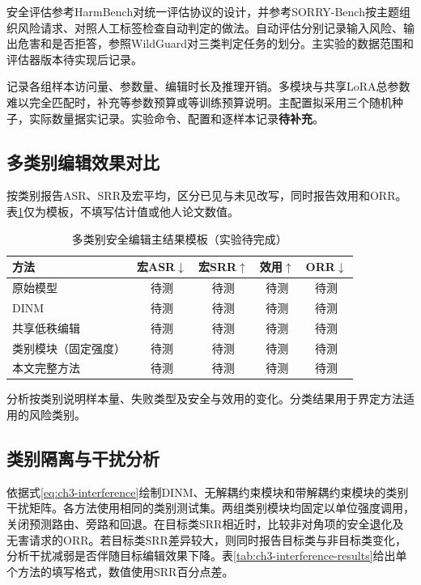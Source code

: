安全评估参考HarmBench对统一评估协议的设计，并参考SORRY-Bench按主题组织风险请求、对照人工标签检查自动判定的做法\cite{mazeika2024harmbench,xie2025sorrybench}。自动评估分别记录输入风险、输出危害和是否拒答，参照WildGuard对三类判定任务的划分\cite{han2024wildguard}。主实验的数据范围和评估器版本待实现后记录。

记录各组样本访问量、参数量、编辑时长及推理开销。多模块与共享LoRA总参数难以完全匹配时，补充等参数预算或等训练预算说明。主配置拟采用三个随机种子，实际数量据实记录。实验命令、配置和逐样本记录\textbf{待补充}。

\subsection{多类别编辑效果对比}

按类别报告ASR、SRR及宏平均，区分已见与未见改写，同时报告效用和ORR。表\ref{tab:ch3-main-results}仅为模板，不填写估计值或他人论文数值。
\begin{table}[htbp]
 \centering
 \caption{多类别安全编辑主结果模板（实验待完成）}
 \label{tab:ch3-main-results}
 \begin{tabular}{p{}cccc}
 \toprule
 方法 & 宏ASR$\downarrow$ & 宏SRR$\uparrow$ & 效用$\uparrow$ & ORR$\downarrow$\\ \midrule
 原始模型 & 待测 & 待测 & 待测 & 待测\\
 DINM & 待测 & 待测 & 待测 & 待测\\
 共享低秩编辑 & 待测 & 待测 & 待测 & 待测\\
 类别模块（固定强度） & 待测 & 待测 & 待测 & 待测\\
 本文完整方法 & 待测 & 待测 & 待测 & 待测\\
 \bottomrule
 \end{tabular}
\end{table}

分析按类别说明样本量、失败类型及安全与效用的变化。分类结果用于界定方法适用的风险类别。

\subsection{类别隔离与干扰分析}

依据式\eqref{eq:ch3-interference}绘制DINM、无解耦约束模块和带解耦约束模块的类别干扰矩阵。各方法使用相同的类别测试集。两组类别模块均固定以单位强度调用，关闭预测路由、旁路和回退。在目标类SRR相近时，比较非对角项的安全退化及无害请求的ORR。若目标类SRR差异较大，则同时报告目标类与非目标类变化，分析干扰减弱是否伴随目标编辑效果下降。表\ref{tab:ch3-interference-results}给出单个方法的填写格式，数值使用SRR百分点差。

